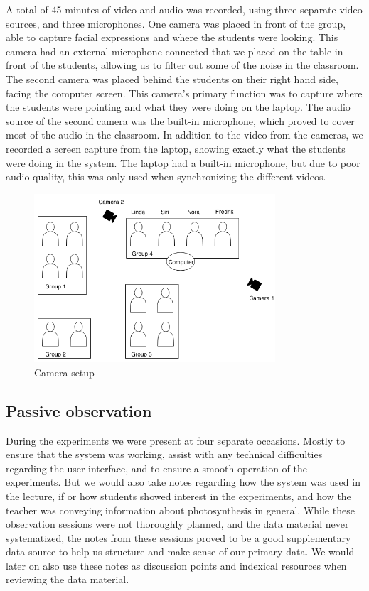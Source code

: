 A total of 45 minutes of video and audio was recorded, using three separate video sources, and three microphones. One camera was placed in front of the group, able to capture facial expressions and where the students were looking. This camera had an external microphone connected that we placed on the table in front of the students, allowing us to filter out some of the noise in the classroom. The second camera was placed behind the students on their right hand side, facing the computer screen. This camera's primary function was to capture where the students were pointing and what they were doing on the laptop. The audio source of the second camera was the built-in microphone, which proved to cover most of the audio in the classroom. In addition to the video from the cameras, we recorded a screen capture from the laptop, showing exactly what the students were doing in the system. The laptop had a built-in microphone, but due to poor audio quality, this was only used when synchronizing the different videos.
\begin{figure}
\centering
\includegraphics[width=0.8\textwidth]{img/empiricalsetting/class_diagram.png}
\caption{Camera setup}
\label{fig:camerasetup}
\end{figure}

\subsection{Passive observation}
During the experiments we were present at four separate occasions. Mostly to ensure that the system was working, assist with any technical difficulties regarding the user interface, and to ensure a smooth operation of the experiments. But we would also take notes regarding how the system was used in the lecture, if or how students showed interest in the experiments, and how the teacher was conveying information about photosynthesis in general. While these observation sessions were not thoroughly planned, and the data material never systematized, the notes from these sessions proved to be a good supplementary data source to help us structure and make sense of our primary data. We would later on also use these notes as discussion points and indexical resources when reviewing the data material. 

